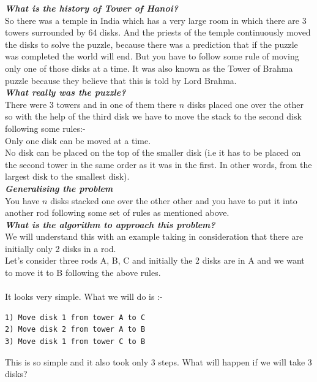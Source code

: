 \documentclass[12pt]{book}
\begin{document}
\textbf{\textit{What is the history of Tower of Hanoi?}}\\
So there was a temple in India which has a very large room in which there are 3 towers surrounded by 64 disks. And the priests of the temple continuously moved the disks to solve the puzzle, because there was a prediction that if the puzzle was completed the world will end. But you have to follow some rule of moving only one of those disks at a time. It was also known as the Tower of Brahma puzzle because they believe that this is told by Lord Brahma.\\

\textbf{\textit{What really was the puzzle?}}\\
There were 3 towers and in one of them there $n$ disks placed one over the other so with the help of the third disk we have to move the stack to the second disk following some rules:-\\
Only one disk can be moved at a time.\\
No disk can be placed on the top of the smaller disk (i.e it has to be placed on the second tower in the same order as it was in the first. In other words, from the largest disk to the smallest disk).\\

\textbf{\textit{Generalising the problem}}\\
You have $n$ disks stacked one over the other other and you have to put it into another rod following some set of rules as mentioned above.\\

\textbf{\textit{What is the algorithm to approach this problem?}}\\
We will understand this with an example taking in consideration that there are initially only 2 disks in a rod.\\
Let’s consider three rods A, B, C and initially the 2 disks are in A and we want to move it to B following the above rules.\\\\
It looks very simple. What we will do is :-\\
\begin{lstlisting}
1) Move disk 1 from tower A to C
2) Move disk 2 from tower A to B
3) Move disk 1 from tower C to B
\end{lstlisting}
This is so simple and it also took only 3 steps. What will happen if we will take 3 disks?\\
\end{document}
